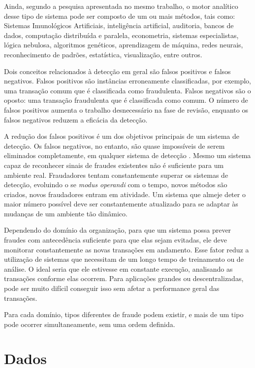 Ainda, segundo a pesquisa apresentada no mesmo trabalho, o motor analítico desse tipo de sistema pode ser composto de um ou mais métodos, tais como: Sistemas Imunológicos Artificiais, inteligência artificial, auditoria, bancos de dados, computação distribuída e paralela, econometria, sistemas especialistas, lógica nebulosa, algoritmos genéticos, aprendizagem de máquina, redes neurais, reconhecimento de padrões, estatística, visualização, entre outros.

Dois conceitos relacionados à detecção em geral são falsos positivos e falsos negativos. Falsos positivos são instâncias erroneamente classificadas, por exemplo, uma transação comum que é classificada como fraudulenta. Falsos negativos são o oposto: uma transação fraudulenta que é classificada como comum. O número de falsos positivos aumenta o trabalho desnecessário na fase de revisão, enquanto os falsos negativos reduzem a eficácia da detecção.

A redução dos falsos positivos é um dos objetivos principais de um sistema de detecção. Os falsos negativos, no entanto, são quase impossíveis de serem eliminados completamente, em qualquer sistema de detecção \cite{Michie1994}. Mesmo um sistema capaz de reconhecer sinais de fraudes existentes não é suficiente para um ambiente real. Fraudadores tentam constantemente superar os sistemas de detecção, evoluindo o se \emph{modus operandi} com o tempo, novos métodos são criados, novos fraudadores entram em atividade. Um sistema que almeje deter o maior número possível deve ser constantemente atualizado para se adaptar às mudanças de um ambiente tão dinâmico.

Dependendo do domínio da organização, para que um sistema possa prever fraudes com antecedência suficiente para que elas sejam evitadas, ele deve monitorar constantemente as novas transações em andamento. Esse fator reduz a utilização de sistemas que necessitam de um longo tempo de treinamento ou de análise. O ideal seria que ele estivesse em constante execução, analisando as transações conforme elas ocorrem. Para aplicações grandes ou descentralizadas, pode ser muito difícil conseguir isso sem afetar a performance geral das transações.

Para cada domínio, tipos diferentes de fraude podem existir, e mais de um tipo pode ocorrer simultaneamente, sem uma ordem definida. 

\section{Dados}
\label{fraud:data}

